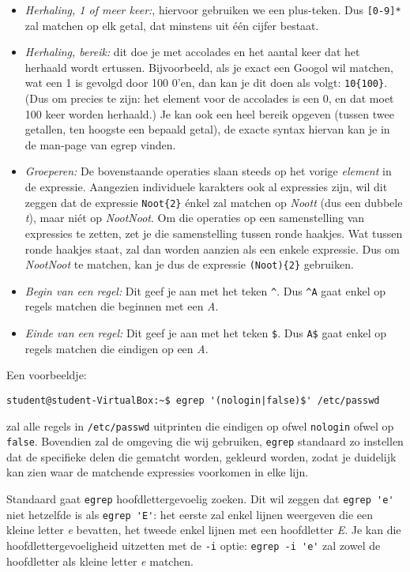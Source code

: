\documentclass[a4paper,twoside,openany]{memoir}
\begin{document}
\begin{itemize}
\item \emph{Herhaling, 1 of meer keer:}, hiervoor gebruiken we een plus-teken. Dus \verb![0-9]*! zal matchen op elk getal, dat minstens uit \'e\'en cijfer bestaat.
\item \emph{Herhaling, bereik:} dit doe je met accolades en het aantal keer dat het herhaald wordt ertussen. Bijvoorbeeld, als je exact een Googol wil matchen, wat een 1 is gevolgd door 100 0'en, dan kan je dit doen als volgt: \verb!10{100}!. (Dus om precies te zijn: het element voor de accolades is een 0, en dat moet 100 keer worden herhaald.) Je kan ook een heel bereik opgeven (tussen twee getallen, ten hoogste een bepaald getal), de exacte syntax hiervan kan je in de man-page van egrep vinden.
\item \emph{Groeperen:} De bovenstaande operaties slaan steeds op het vorige \emph{element} in de expressie. Aangezien individuele karakters ook al expressies zijn, wil dit zeggen dat de expressie \verb!Noot{2}! \'enkel zal matchen op \emph{Noott} (dus een dubbele \emph{t}), maar ni\'et op \emph{NootNoot}. Om die operaties op een samenstelling van expressies te zetten, zet je die samenstelling tussen ronde haakjes. Wat tussen ronde haakjes staat, zal dan worden aanzien als een enkele expressie. Dus om \emph{NootNoot} te matchen, kan je dus de expressie \verb!(Noot){2}! gebruiken.
\item \emph{Begin van een regel:} Dit geef je aan met het teken \verb!^!. Dus \verb!^A! gaat enkel op regels matchen die beginnen met een \emph{A}.
\item \emph{Einde van een regel:} Dit geef je aan met het teken \verb!$!. Dus \verb!A$! gaat enkel op regels matchen die eindigen op een \emph{A}.
\end{itemize}

Een voorbeeldje:

\begin{verbatim}
student@student-VirtualBox:~$ egrep '(nologin|false)$' /etc/passwd
\end{verbatim}

zal alle regels in \verb!/etc/passwd! uitprinten die eindigen op ofwel \verb!nologin! ofwel op \verb!false!. Bovendien zal de omgeving die wij gebruiken, \verb!egrep! standaard zo instellen dat de specifieke delen die gematcht worden, gekleurd worden, zodat je duidelijk kan zien waar de matchende expressies voorkomen in elke lijn.

Standaard gaat \verb!egrep! hoofdlettergevoelig zoeken. Dit wil zeggen dat \verb!egrep 'e'! niet hetzelfde is als \verb!egrep 'E'!: het eerste zal enkel lijnen weergeven die een kleine letter \emph{e} bevatten, het tweede enkel lijnen met een hoofdletter \emph{E}. Je kan die hoofdlettergevoeligheid uitzetten met de \verb!-i! optie: \verb!egrep -i 'e'! zal zowel de hoofdletter als kleine letter \emph{e} matchen.
\end{document}
